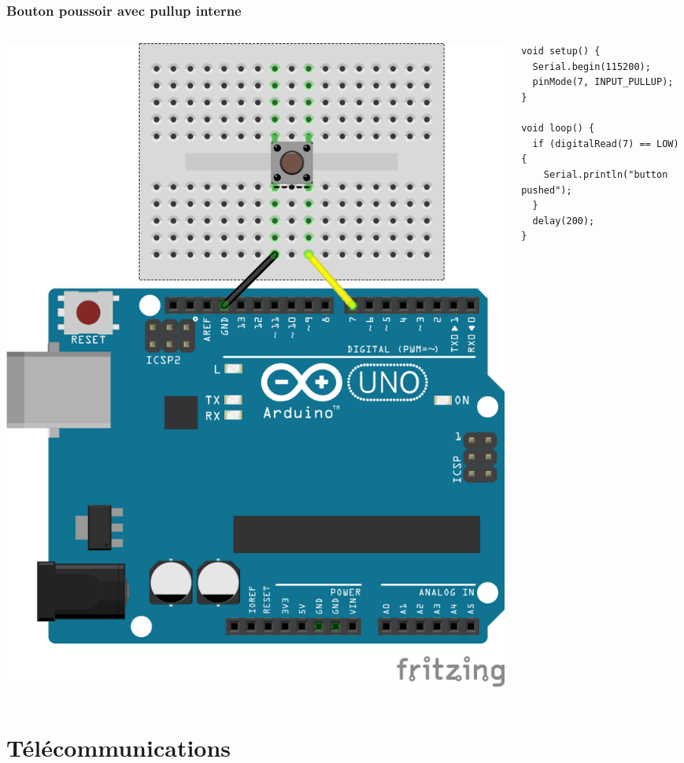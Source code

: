 \documentclass[aspectratio=169,utf8,french]{beamer}
\begin{document}
\begin{frame}[fragile]
\frametitle{Bouton poussoir avec pullup interne}
\begin{columns}
  \begin{column}{.5\linewidth}
    \includegraphics[height=.8\textheight]{pictures/UNO-push-pullup_bb.png}
  \end{column}
  \begin{column}{.5\linewidth}
    \begin{lstlisting}
void setup() {
  Serial.begin(115200);
  pinMode(7, INPUT_PULLUP);
}

void loop() {
  if (digitalRead(7) == LOW) {
    Serial.println("button pushed");
  }
  delay(200);
}
    \end{lstlisting}
  \end{column}
\end{columns}
\end{frame}

\section{Télécommunications}
\end{document}
